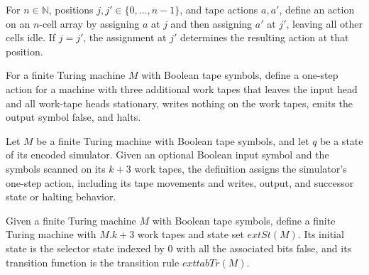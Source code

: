 \begin{definition}
\label{Complexity.Meyer.two}
\leanok
{}
For $n\in\mathbb{N}$, positions $j,j'\in\{0,\ldots,n-1\}$, and tape actions $a,a'$,
define an action on an $n$-cell array by assigning $a$ at $j$ and then assigning $a'$ at
$j'$, leaving all other cells idle. If $j=j'$, the assignment at $j'$ determines the
resulting action at that position.
\end{definition}

\begin{definition}
\label{Complexity.Meyer.reject}
\leanok
{}
For a finite Turing machine $M$ with Boolean tape symbols, define a one-step action for
a machine with three additional work tapes that leaves the input head and all work-tape
heads stationary, writes nothing on the work tapes, emits the output symbol false, and
halts.
\end{definition}

\begin{definition}
\label{Complexity.Meyer.tabTr}
\leanok
{}
Let $M$ be a finite Turing machine with Boolean tape symbols, and let $q$ be a state of
its encoded simulator. Given an optional Boolean input symbol and the symbols scanned on
its $k+3$ work tapes, the definition assigns the simulator’s one-step action, including
its tape movements and writes, output, and successor state or halting behavior.
\end{definition}

\begin{definition}
\label{Complexity.Meyer.tabTM}
\leanok
{}
Given a finite Turing machine $M$ with Boolean tape symbols, define a finite Turing
machine with $M.k+3$ work tapes and state set $	ext{St}(M)$. Its initial state is the
selector state indexed by $0$ with all the associated bits false, and its transition
function is the transition rule $	ext{tabTr}(M)$.
\end{definition}

